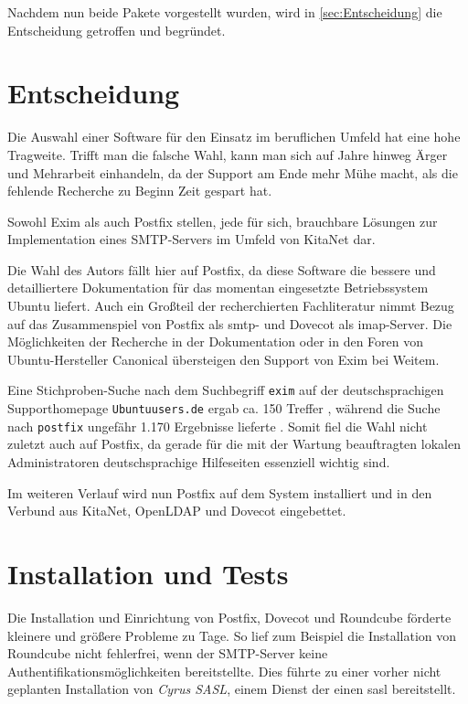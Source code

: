 Nachdem nun beide Pakete vorgestellt wurden, wird in \autoref{sec:Entscheidung} die Entscheidung getroffen und begründet.

\chapter{Entscheidung}
\label{sec:Entscheidung}

Die Auswahl einer Software für den Einsatz im beruflichen Umfeld hat eine hohe Tragweite. Trifft man die falsche Wahl, kann man sich auf Jahre hinweg Ärger und Mehrarbeit einhandeln, da der Support am Ende mehr Mühe macht, als die fehlende Recherche zu Beginn Zeit gespart hat.

Sowohl Exim als auch Postfix stellen, jede für sich, brauchbare Lösungen zur Implementation eines SMTP-Servers im Umfeld von KitaNet dar. 

Die Wahl des Autors fällt hier auf Postfix, da diese Software die bessere und detailliertere Dokumentation für das momentan eingesetzte Betriebssystem Ubuntu liefert. Auch ein Großteil der recherchierten Fachliteratur nimmt Bezug auf das Zusammenspiel von Postfix als \ac{smtp}- und Dovecot als \ac{imap}-Server.
Die Möglichkeiten der Recherche in der Dokumentation oder in den Foren von Ubuntu-Hersteller Canonical übersteigen den Support von Exim bei Weitem.

Eine Stichproben-Suche nach dem Suchbegriff \verb+exim+ auf der deutschsprachigen Supporthomepage \verb+Ubuntuusers.de+ ergab ca. 150 Treffer \citep[vgl.][]{googleexim}, während die Suche nach \verb+postfix+ ungefähr 1.170 Ergebnisse lieferte \citep[vgl.][]{googlepostfix}.
Somit fiel die Wahl nicht zuletzt auch auf Postfix, da gerade für die mit der Wartung beauftragten lokalen Administratoren deutschsprachige Hilfeseiten essenziell wichtig sind.

Im weiteren Verlauf wird nun Postfix auf dem System installiert und in den Verbund aus KitaNet, OpenLDAP und Dovecot eingebettet.

\chapter{Installation und Tests}

Die Installation und Einrichtung von Postfix, Dovecot und Roundcube förderte kleinere und größere Probleme zu Tage. 
So lief zum Beispiel die Installation von Roundcube nicht fehlerfrei, wenn der SMTP-Server keine Authentifikationsmöglichkeiten \citep[vgl. hierzu][]{rfc4954} bereitstellte. 
Dies führte zu einer vorher nicht geplanten Installation von \textit{Cyrus SASL}, einem Dienst der einen \ac{sasl} bereitstellt. 

